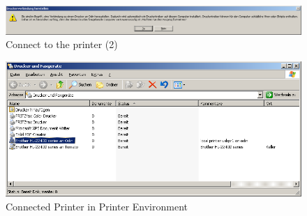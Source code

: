 \begin{figure}[hbt!]
\centering
\includegraphics[width=\columnwidth]{image021}
\caption{Connect to the printer (2)}
\label{fig:sambalpd:connect:2}
\end{figure}

\begin{figure}[hbt!]
\centering
\includegraphics[width=\columnwidth]{image022}
\caption{Connected Printer in Printer Environment}
\label{fig:sambalpd:printer-environment}
\end{figure}
